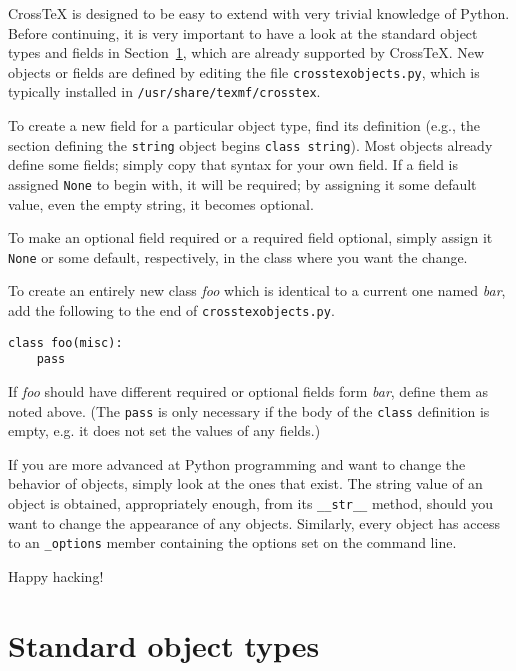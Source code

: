 \documentclass{article}
\newcommand{\XTeX}{Cross\TeX}
\begin{document}
\XTeX{} is designed to be easy to extend with very trivial knowledge of Python. Before continuing, it is very important to have a look at the standard object types and fields in Section~\ref{objects}, which are already supported by \XTeX{}. New objects or fields are defined by editing the file \texttt{crosstexobjects.py}, which is typically installed in \texttt{/usr/share/texmf/crosstex}.

To create a new field for a particular object type, find its definition (e.g., the section defining the \texttt{string} object begins \texttt{class string}). Most objects already define some fields; simply copy that syntax for your own field. If a field is assigned \texttt{None} to begin with, it will be required; by assigning it some default value, even the empty string, it becomes optional.

To make an optional field required or a required field optional, simply assign it \texttt{None} or some default, respectively, in the class where you want the change.

To create an entirely new class \textit{foo} which is identical to a current one named \textit{bar}, add the following to the end of \texttt{crosstexobjects.py}.

\begin{small}\begin{verbatim}
class foo(misc):
    pass
\end{verbatim}\end{small}

If \textit{foo} should have different required or optional fields form \textit{bar}, define them as noted above. (The \texttt{pass} is only necessary if the body of the \texttt{class} definition is empty, e.g. it does not set the values of any fields.)

If you are more advanced at Python programming and want to change the behavior of objects, simply look at the ones that exist. The string value of an object is obtained, appropriately enough, from its \texttt{\_\_str\_\_} method, should you want to change the appearance of any objects. Similarly, every object has access to an \texttt{\_options} member containing the options set on the command line.

Happy hacking!



\section{Standard object types}
\label{objects}
\end{document}
